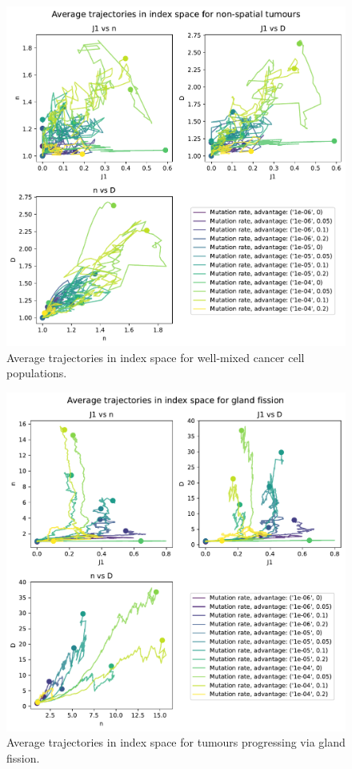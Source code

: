 \begin{figure}
    \centering
    \includegraphics[width=\textwidth]{Chapter_3/figures/indspace-non-spatial.pdf}
    \caption{Average trajectories in index space for well-mixed cancer cell populations.}
    \label{fig:non-spatial-indspace}
\end{figure}
\begin{figure}
    \centering
    \includegraphics[width=\textwidth]{Chapter_3/figures/indspace-gland.pdf}
    \caption{Average trajectories in index space for tumours progressing via gland fission.}
    \label{fig:gland-indspace}
\end{figure}

